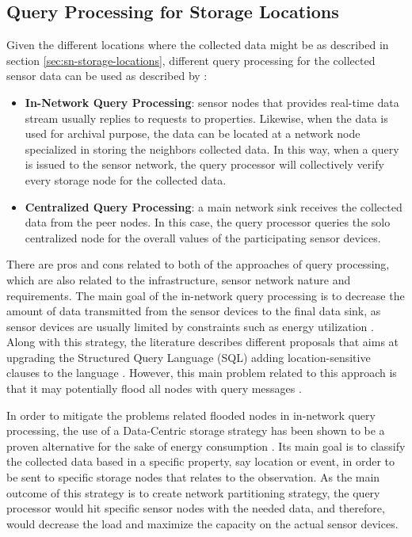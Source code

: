 \subsection{Query Processing for Storage Locations}
\label{sec:query-process}

Given the different locations where the collected data might be as described in
section \ref{sec:sn-storage-locations}, different query processing for the
collected sensor data can be used as described by \cite{sn-storage03}:

\begin{itemize}
  \item \textbf{In-Network Query Processing}: sensor nodes that provides
  real-time data stream usually replies to requests to properties. Likewise, when the
  data is used for archival purpose, the data can be located at a network node
  specialized in storing the neighbors collected data. In this way, when a
  query is issued to the sensor network, the query processor will
  collectively verify every storage node for the collected data.
  \item \textbf{Centralized Query Processing}: a main network sink receives the
  collected data from the peer nodes. In this case, the query processor queries
  the solo centralized node for the overall values of the participating sensor
  devices.
\end{itemize}

There are pros and cons related to both of the approaches of query processing,
which are also related to the infrastructure, sensor network nature and 
requirements. The main goal of the in-network query processing is to decrease
the amount of data transmitted from the sensor devices to the final data sink, as
sensor devices are usually limited by constraints such as energy utilization 
\cite{sn-storage03}. Along with this strategy, the literature describes
different proposals that aims at upgrading the Structured Query Language (SQL)
adding location-sensitive clauses to the language \cite{sn-db-newop}. However,
this main problem related to this approach is that it may potentially flood
all nodes with query messages \cite{sn-storage04}.

In order to mitigate the problems related flooded nodes in in-network query
processing, the use of a Data-Centric storage strategy has been shown to be a
proven alternative for the sake of energy consumption \cite{sn-storage03}
\cite{sn-storage01}. Its main goal is to classify the collected data based in a
specific property, say location or event, in order to be sent to specific
storage nodes that relates to the observation. As the main outcome of this
strategy is to create network partitioning strategy, the query processor would
hit specific sensor nodes with the needed data, and therefore, would
decrease the load and maximize the capacity on the actual sensor devices.

